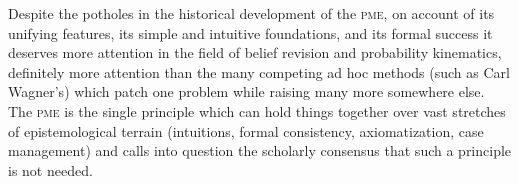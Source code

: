 Despite the potholes in the historical development of the
\textsc{pme}, on account of its unifying features, its simple and
intuitive foundations, and its formal success it deserves more
attention in the field of belief revision and probability kinematics,
definitely more attention than the many competing ad hoc methods (such
as Carl Wagner's) which patch one problem while raising many more
somewhere else. The \textsc{pme} is the single principle which can
hold things together over vast stretches of epistemological terrain
(intuitions, formal consistency, axiomatization, case management) and
calls into question the scholarly consensus that such a principle is
not needed.
